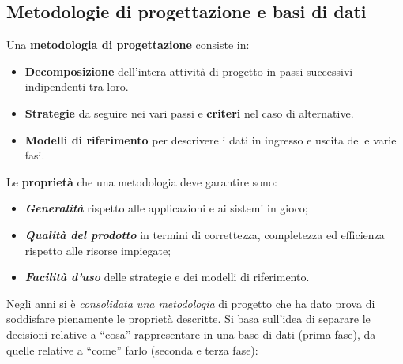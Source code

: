 \documentclass[a4paper]{article}
\newcommand{\dquotes}[1]{``#1''}
\begin{document}
	\newpage
	
	
	
	
	\subsection{Metodologie di progettazione e basi di dati}
	
	Una \textbf{metodologia di progettazione} consiste in:
	
	\begin{itemize}
		\item[\ding{51}] \textbf{Decomposizione} dell'intera attività di progetto in passi successivi indipendenti tra loro.
		
		\item[\ding{51}] \textbf{Strategie} da seguire nei vari passi e \textbf{criteri} nel caso di alternative.
		
		\item[\ding{51}] \textbf{Modelli di riferimento} per descrivere i dati in ingresso e uscita delle varie fasi.
	\end{itemize}

	\noindent
	Le \textbf{proprietà} che una metodologia deve garantire sono:
	
	\begin{itemize}
		\item[\ding{72}] \textbf{\emph{Generalità}} rispetto alle applicazioni e ai sistemi in gioco;
		
		\item[\ding{72}] \textbf{\emph{Qualità del prodotto}} in termini di correttezza, completezza ed efficienza rispetto alle risorse impiegate;
		
		\item[\ding{72}] \textbf{\emph{Facilità d'uso}} delle strategie e dei modelli di riferimento.
	\end{itemize}


	Negli anni si è \emph{consolidata una metodologia} di progetto che ha dato prova di soddisfare pienamente le proprietà descritte. Si basa sull'idea di separare le decisioni relative a \dquotes{cosa} rappresentare in una base di dati (prima fase), da quelle relative a \dquotes{come} farlo (seconda e terza fase):
	
\end{document}
